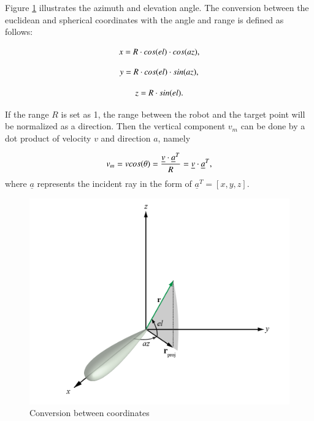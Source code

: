 \documentclass[12pt,DIV14,BCOR12mm,a4paper,footinclude=false,headinclude,parskip=half-,twoside,openright,cleardoublepage=empty,toc=index,bibliography=totoc,listof=totoc]{scrreprt}
\numberwithin{equation}{chapter}
\begin{document}
\begin{enumerate}[label=\textbullet]
    Figure \ref{conversion between coordinates} illustrates the azimuth and elevation angle. The conversion between the euclidean and spherical coordinates with the angle and range \cite{coordinate_definition} is defined as follows:

    \begin{equation}
    \centering
    x = R\cdot cos(el)\cdot cos(az),
    \end{equation}

    \begin{equation}
    \centering
    y = R\cdot cos(el)\cdot sin(az),
    \end{equation}

    \begin{equation}
    \centering
    z = R\cdot sin(el).
    \end{equation}

    If the range $R$ is set as 1, the range between the robot and the target point will be normalized as a direction. Then the vertical component $v_m$ can be done by a dot product of velocity $v$ and direction $a$, namely

    \begin{equation}
    \centering
    v_m = vcos(\theta) = \frac{\underline{v} \cdot \underline{a}^{T}}{R} = \underline{v} \cdot \underline{a}^{T},
    \end{equation}
    where $\underline{a}$ represents the incident ray in the form of $\underline{a}^{T}=[x, y, z]$.

    \begin{figure}[t]
	\centering
	\includegraphics[scale=.4]{figures/relative_velocity.png}
	\caption{Conversion between coordinates \cite{coordinate_definition}}
	\label{conversion between coordinates}
    \end{figure}
    
\end{enumerate}
\end{document}
